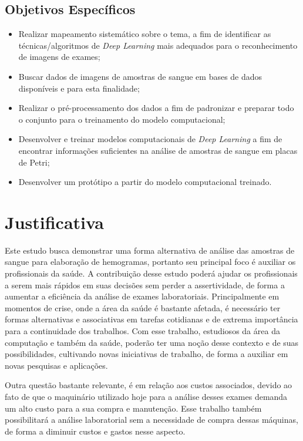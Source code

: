 \subsection{Objetivos Específicos}
\begin{itemize}
	\item Realizar mapeamento sistemático sobre o tema, a fim de identificar as técnicas/algoritmos de \emph{Deep Learning} mais adequados para o reconhecimento de imagens de exames;
	\item Buscar dados de imagens de amostras de sangue em bases de dados disponíveis e para esta finalidade;
	\item Realizar o pré-processamento dos dados a fim de padronizar e preparar todo o conjunto para o treinamento do modelo computacional;
	\item Desenvolver e treinar modelos computacionais de \emph{Deep Learning} a fim de encontrar informações suficientes na análise de amostras de sangue em placas de Petri;
	\item Desenvolver um protótipo a partir do modelo computacional treinado.
\end{itemize}

\section{Justificativa}
\label{sec:justificativa}
Este estudo busca demonstrar uma forma alternativa de análise das amostras de sangue para elaboração de hemogramas, portanto seu principal foco é auxiliar os profissionais da saúde. A contribuição desse estudo poderá ajudar os profissionais a serem mais rápidos em suas decisões sem perder a assertividade, de forma a aumentar a eficiência da análise de exames laboratoriais. Principalmente em momentos de crise, onde a área da saúde é bastante afetada, é necessário ter formas alternativas e associativas em tarefas cotidianas e de extrema importância para a continuidade dos trabalhos. Com esse trabalho, estudiosos da área da computação e também da saúde, poderão ter uma noção desse contexto e de suas possibilidades, cultivando novas iniciativas de trabalho, de forma a auxiliar em novas pesquisas e aplicações.

Outra questão bastante relevante, é em relação aos custos associados, devido ao fato de que o maquinário utilizado hoje para a análise desses exames demanda um alto custo para a sua compra e manutenção. Esse trabalho também possibilitará a análise laboratorial sem a necessidade de compra dessas máquinas, de forma a diminuir custos e gastos nesse aspecto.

